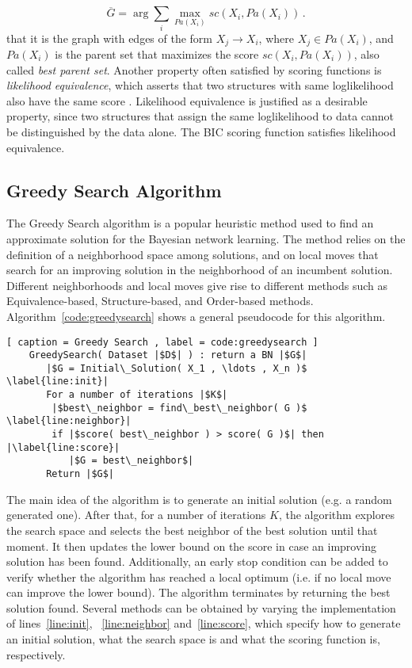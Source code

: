 	\begin{equation} \label{eq:bestparents}
		\overline{G} = \arg \sum_i \max_{{Pa}(X_i)} sc( X_i, {Pa}( X_i ) ) \, . 
	\end{equation}
that it is the graph with edges of the form $X_j \rightarrow X_i$, where $X_j \in {Pa}( X_i )$, and ${Pa}( X_i )$ is the parent set that maximizes the score ${sc}( X_i , {Pa}( X_i ) )$, also called \emph{best parent set}.
Another property often satisfied by scoring functions is \emph{likelihood equivalence}, which asserts that two structures with same loglikelihood also have the same score \cite{Maxwell04}. Likelihood equivalence is justified as a desirable property, since two structures that assign the same loglikelihood to data cannot be distinguished by the data alone. The BIC scoring function satisfies likelihood equivalence.

\subsection{Greedy Search Algorithm}
\label{subsec:greedysearch}

The Greedy Search algorithm is a popular heuristic method used to find an approximate solution for the Bayesian network learning. The method relies on the definition of a neighborhood space among solutions, and on local moves that search for an improving solution in the neighborhood of an incumbent solution. Different neighborhoods and local moves give rise to different methods such as Equivalence-based, Structure-based,  and Order-based methods. Algorithm~\ref{code:greedysearch} shows a general pseudocode for this algorithm.

\begin{lstlisting}[ caption = Greedy Search , label = code:greedysearch ]
	GreedySearch( Dataset |$D$| ) : return a BN |$G$|
	   |$G = Initial\_Solution( X_1 , \ldots , X_n )$ \label{line:init}|
	   For a number of iterations |$K$|
		|$best\_neighbor = find\_best\_neighbor( G )$ \label{line:neighbor}|
		if |$score( best\_neighbor ) > score( G )$| then |\label{line:score}|
		   |$G = best\_neighbor$|
	   Return |$G$|
\end{lstlisting}
The main idea of the algorithm is to generate an initial solution (e.g. a random generated one). After that, for a number of iterations $K$, the algorithm explores the search space and selects the best neighbor of the best solution until that moment. It then updates the lower bound on the score in case an improving solution has been found. Additionally, an early stop condition can be added to verify whether the algorithm has reached a local optimum (i.e. if no local move can improve the lower bound). The algorithm terminates by returning the best solution found.
Several methods can be obtained by varying the implementation of lines~\ref{line:init}, ~\ref{line:neighbor} and~\ref{line:score}, which specify how to generate an initial solution, what the search space is and what the scoring function is, respectively.


